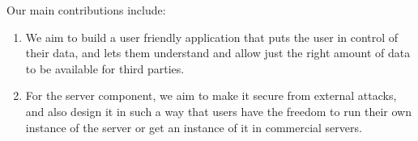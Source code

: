 Our main contributions include:
\begin{enumerate}
	\item We aim to build a user friendly application that puts the user in control of their data, and lets them understand and allow just the right amount of data to be available for third parties.

	\item For the server component, we aim to make it secure from external attacks, and also design it in such a way that users have the freedom to run their own instance of the server or get an instance of it in commercial servers.
\end{enumerate}
